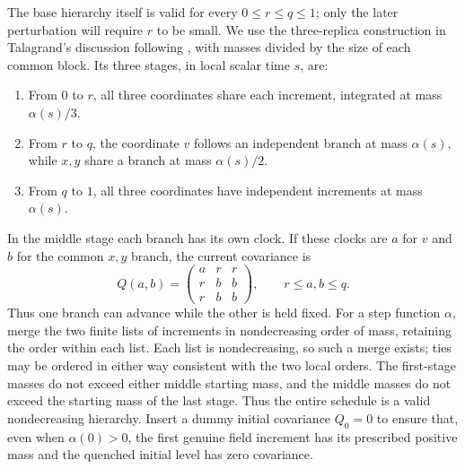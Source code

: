 The base hierarchy itself is valid for every $0\le r\le q\le1$;
only the later perturbation will require $r$ to be small. We use the
three-replica construction in Talagrand's discussion following
\cite[Proposition~4.4]{Talagrand07}, with masses divided by the size
of each common block. Its three stages, in local scalar time $s$, are:
\begin{enumerate}[label=\textup{(\roman*)}]
\item From $0$ to $r$, all three coordinates share each increment,
      integrated at mass $\alpha(s)/3$.
\item From $r$ to $q$, the coordinate $v$ follows an independent branch
      at mass $\alpha(s)$, while $x,y$ share a branch at mass
      $\alpha(s)/2$.
\item From $q$ to $1$, all three coordinates have independent increments
      at mass $\alpha(s)$.
\end{enumerate}
In the middle stage each branch has its own clock. If these clocks are
$a$ for $v$ and $b$ for the common $x,y$ branch, the current covariance is
\[
 Q(a,b)=\begin{pmatrix}a&r&r\\r&b&b\\r&b&b\end{pmatrix},
 \qquad r\le a,b\le q.
\]
Thus one branch can advance while the other is held fixed. For a step
function $\alpha$, merge the two finite lists of increments in nondecreasing
order of mass, retaining the order within each list. Each list is
nondecreasing, so such a merge exists; ties may be ordered in either
way consistent with the two local orders. The first-stage masses do
not exceed either middle starting mass, and the middle masses do not
exceed the starting mass of the last stage. Thus the entire schedule
is a valid nondecreasing hierarchy. Insert a dummy initial covariance
$Q_0=0$ to ensure that, even when $\alpha(0)>0$, the first genuine field
increment has its prescribed positive mass and the quenched initial
level has zero covariance.

